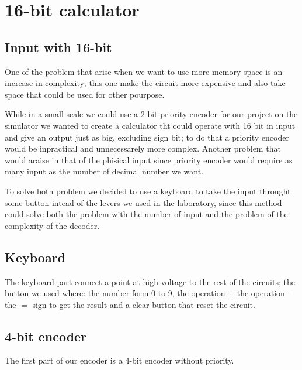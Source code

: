 \documentclass{article}
\begin{document}
\section{16-bit calculator}



\subsection{Input with 16-bit}

One of the problem that arise when we want to use more memory space is an increase in complexity; this one make the circuit more expensive and also take space that could be used for other pourpose. 

While in a small scale we could use a 2-bit priority encoder for our project on the simulator we wanted to create a calculator tht could operate with 16 bit in input and give an output just as big, excluding sign bit; to do that a priority encoder would be inpractical and unnecessarely more complex.
Another problem that would araise in that of the phisical input since  priority encoder would require as many input as the number of decimal number we want.

\vspace{3mm}

To solve both problem we decided to use a keyboard to take the input throught some button intead of the levers we used in the laboratory, since this method could solve both the problem with the number of input and the problem of the complexity of the decoder.



\subsection{Keyboard}

The keyboard part connect a point at high voltage to the rest of the circuits; the button we used where: the number form 0 to 9, the operation $+$ the operation $-$ the $=$ sign to get the result and a clear button that reset the circuit.




\subsection{4-bit encoder}
The first part of our encoder is a 4-bit encoder without priority. 

\end{document}
